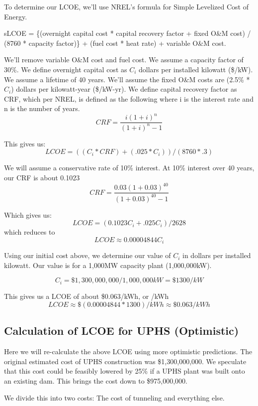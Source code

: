 To determine our LCOE, we'll use NREL's formula for Simple Levelized Cost of Energy.

\begin{displayquote}
sLCOE = \{(overnight capital cost * capital recovery factor + fixed O\&M cost) / (8760 * capacity factor)\} + (fuel cost * heat rate) + variable O\&M cost. \cite{SimpleLevelizedCostOfEnergyCalculator}
\end{displayquote}

We'll remove variable O\&M cost and fuel cost. We assume a capacity factor of 30\%. We define overnight capital cost as $C_i$ dollars per installed kilowatt (\$/kW). We assume a lifetime of 40 years. We'll assume the fixed O\&M costs are (2.5\% * $C_i$) dollars per kilowatt-year (\$/kW-yr). We define capital recovery factor as CRF, which per NREL, is defined as the following where i is the interest rate and n is the number of years.
\[ \displaystyle CRF={\frac {i(1+i)^{n}}{(1+i)^{n}-1}} \]

This gives us:
\[ LCOE = ((C_i * CRF) + (.025 * C_i)) / (8760 * .3) \]

We will assume a conservative rate of 10\% interest. At 10\% interest over 40 years, our CRF is about 0.1023
\[ \displaystyle CRF={\frac {0.03(1+0.03)^{40}}{(1+0.03)^{40}-1}} \]

Which gives us:
\[ LCOE = (0.1023C_i + .025C_i) / 2628 \]
which reduces to
\[ LCOE \approx 0.00004844 C_i \]

Using our initial cost above, we determine our value of $C_i$ in dollars per installed kilowatt. Our value is for a 1,000MW capacity plant (1,000,000kW).

\[ C_i = \$1,300,000,000 / 1,000,000kW = \$1300/kW\]

This gives us a LCOE of about \$0.063/kWh, or /kWh
\[ LCOE \approx \$(0.00004844 * 1300)/kWh \approx \$0.063/kWh \]


\subsection{Calculation of LCOE for UPHS (Optimistic)}
Here we will re-calculate the above LCOE using more optimistic predictions. The original estimated cost of UPHS construction was \$1,300,000,000. We speculate that this cost could be feasibly lowered by 25\% if a UPHS plant was built onto an existing dam. This brings the cost down to \$975,000,000.

We divide this into two costs: The cost of tunneling and everything else.

